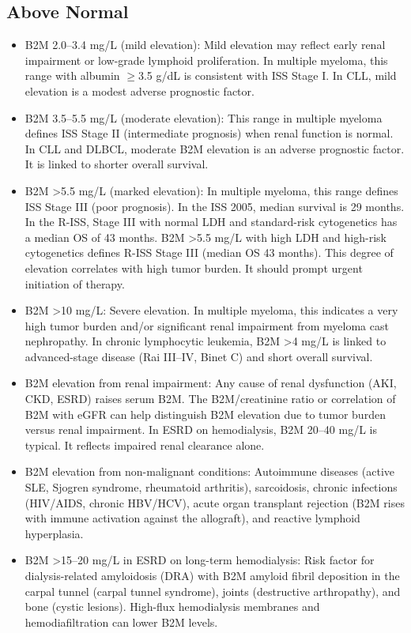 \subsection*{Above Normal}
\begin{itemize}
  \item B2M 2.0--3.4 mg/L (mild elevation): Mild elevation may reflect early renal impairment or low-grade lymphoid proliferation. In multiple myeloma, this range with albumin $\geq$3.5 g/dL is consistent with ISS Stage I. In CLL, mild elevation is a modest adverse prognostic factor.
  \item B2M 3.5--5.5 mg/L (moderate elevation): This range in multiple myeloma defines ISS Stage II (intermediate prognosis) when renal function is normal. In CLL and DLBCL, moderate B2M elevation is an adverse prognostic factor. It is linked to shorter overall survival.
  \item B2M >5.5 mg/L (marked elevation): In multiple myeloma, this range defines ISS Stage III (poor prognosis). In the ISS 2005, median survival is 29 months. In the R-ISS, Stage III with normal LDH and standard-risk cytogenetics has a median OS of 43 months. B2M >5.5 mg/L with high LDH and high-risk cytogenetics defines R-ISS Stage III (median OS 43 months). This degree of elevation correlates with high tumor burden. It should prompt urgent initiation of therapy.
  \item B2M >10 mg/L: Severe elevation. In multiple myeloma, this indicates a very high tumor burden and/or significant renal impairment from myeloma cast nephropathy. In chronic lymphocytic leukemia, B2M >4 mg/L is linked to advanced-stage disease (Rai III--IV, Binet C) and short overall survival.
  \item B2M elevation from renal impairment: Any cause of renal dysfunction (AKI, CKD, ESRD) raises serum B2M. The B2M/creatinine ratio or correlation of B2M with eGFR can help distinguish B2M elevation due to tumor burden versus renal impairment. In ESRD on hemodialysis, B2M 20--40 mg/L is typical. It reflects impaired renal clearance alone.
  \item B2M elevation from non-malignant conditions: Autoimmune diseases (active SLE, Sjogren syndrome, rheumatoid arthritis), sarcoidosis, chronic infections (HIV/AIDS, chronic HBV/HCV), acute organ transplant rejection (B2M rises with immune activation against the allograft), and reactive lymphoid hyperplasia.
  \item B2M >15--20 mg/L in ESRD on long-term hemodialysis: Risk factor for dialysis-related amyloidosis (DRA) with B2M amyloid fibril deposition in the carpal tunnel (carpal tunnel syndrome), joints (destructive arthropathy), and bone (cystic lesions). High-flux hemodialysis membranes and hemodiafiltration can lower B2M levels.
\end{itemize}

